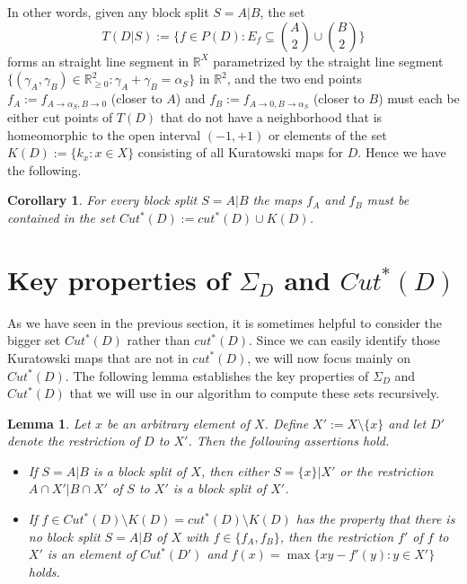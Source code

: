 \documentclass[12pt]{article}
\newtheorem{lemma}[prop]{Lemma}
\newtheorem{cor}[prop]{Corollary}
\newcommand{\R}{{\mathbb R}}
\newcommand{\ra}{\rightarrow}
\begin{document}
In other words, given any block split $S=A|B$, the set 
\[
T(D|S):=\{f\in P(D): E_f\subseteq \binom{A}{2} \cup \binom{B}{2}\}
\]
forms an straight line segment in \(\mathbb{R}^X\) parametrized by the straight line segment
$\{(\gamma_A, \gamma_B) \in \R_{\ge 0}^2: \gamma_A+ \gamma_B = \alpha_S\}$ in $\R^2$, and the two end points 
$f_A:= f_{A\ra\alpha_S ,B\ra 0}$ (closer to $A$) and 
$f_B:= f_{A\ra 0,B\ra\alpha_S }$ (closer to $B$) must each be either cut points of $T(D)$ that do not have a
neighborhood that is homeomorphic to the open interval 
\((-1,+1)\) or elements of the set \(K(D):=\{k_x:x\in X\}\) consisting of all Kuratowski maps 
for \(D\). Hence we have the following.

\begin{cor}
\label{corollary:endpoints:bridges}
For every block split \(S=A|B\) the maps 
\(f_A\) and \(f_B\) must be contained in the set 
\(Cut^*(D):= cut^*(D) \cup K(D)\). 
\end{cor}

\section{Key properties of $\Sigma_D$ and $Cut^*(D)$}
\label{section:key:properties}


As we have seen in the previous section, it is sometimes helpful to consider
the bigger set \(Cut^*(D)\) rather than \(cut^*(D)\). Since we can easily identify
those Kuratowski maps that are not in \(cut^*(D)\), 
we will now focus mainly on \(Cut^*(D)\). The following lemma establishes the 
key properties of $\Sigma_D$ and $Cut^*(D)$ that we will use in our algorithm 
to compute these sets recursively.

\begin{lemma}
\label{lemma:recursive:approach}
Let \(x\) be an arbitrary element of \(X\). 
Define \(X' := X \setminus \{x\}\)
and let \(D'\) denote the restriction of \(D\) to \(X'\).
Then the following assertions hold.
\begin{itemize}
\item[(i)]
If \(S=A|B\) is a block split of \(X\), then either \(S=\{x\}|X'\) or 
the restriction \(A \cap X'|B \cap X'\) of \(S\) to \(X'\) is a block split of \(X'\).
\item[(ii)]
If \(f \in Cut^*(D) \setminus K(D)=cut^*(D) \setminus K(D)\) has the property that there is no
block split \(S = A|B\) of \(X\) with \(f  \in \{f_A,f_B\}\),
then the restriction \(f'\) of \(f\) to \(X'\) is an element
of \(Cut^*(D')\) and \(f(x) = \max\{xy-f'(y) : y \in X'\}\) holds.
\end{itemize}
\end{lemma}
\end{document}
